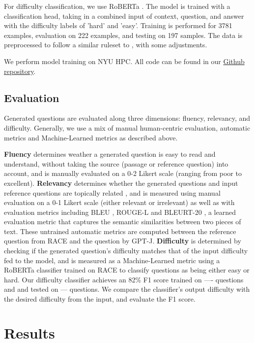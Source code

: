 \documentclass[11pt]{article}
\begin{document}
For difficulty classification, we use RoBERTa \citep{roberta:12}. The model is trained with a classification head, taking in a combined input of context, question, and answer with the difficulty labels of 'hard' and 'easy'. Training is performed for 3781 examples, evaluation on 222 examples, and testing on 197 samples. The data is preprocessed to follow a similar ruleset to \citet{Difficulty:3}, with some adjustments.

We perform model training on NYU HPC. All code can be found in our \href{https://github.com/rbolline/Neural-Question-Generation-with-GPT-J}{Github repository}. 


\subsection{Evaluation}

Generated questions are evaluated along three dimensions: fluency, relevancy, and difficulty. Generally, we use a mix of manual human-centric evaluation, automatic metrics and Machine-Learned metrics as described above.

\textbf{Fluency} determines weather a generated question is easy to read and understand, without taking the source (passage or reference question) into account, and is manually evaluated on a 0-2 Likert scale (ranging from poor to excellent). \textbf{Relevancy} determines whether the generated questions and input reference questions are topically related \citep{relevancy:14}, and is measured using manual evaluation on a 0-1 Likert scale (either relevant or irrelevant) as well as with evaluation metrics including BLEU \citep{BLEU:6}, ROUGE-L \citep{rouge:5} and BLEURT-20 \citep{bleurt:7}, a learned evaluation metric that captures the semantic similarities between two pieces of text. These untrained automatic metrics are computed between the reference question from RACE and the question by GPT-J. \textbf{Difficulty} is determined by checking if the generated question’s difficulty matches that of the input difficulty fed to the model, and is measured as a Machine-Learned metric using a RoBERTa \citep{roberta:12} classifier trained on RACE to classify questions as being either easy or hard. Our difficulty classifier achieves an 82\% F1 score trained on ---- questions and and tested on --- questions. We compare the classifier's output difficulty with the desired difficulty from the input, and evaluate the F1 score.  

\section{Results}
\end{document}

